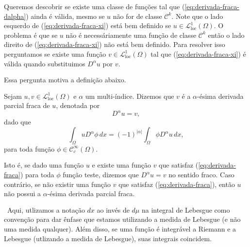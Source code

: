 \documentclass[a4paper, 11pt]{book}
\theoremstyle{definition}
\newcommand{\obs}{\noindent{\textbf{\textcolor{black}{\sffamily Observação:}}}~}
\newcommand{\cC}{\mathcal{C}}
\newcommand{\cL}{\mathcal{L}}
\begin{document}
Queremos descobrir se existe uma classe de funções tal que (\ref{eq:derivada-fraca-dalpha}) ainda é válida, mesmo se $u$ não for de classe $\cC ^k$. Note que o lado esquerdo de (\ref{eq:derivada-fraca-xi}) está bem definido se $u \in \cL^1_{\mathrm{loc}}(\Omega)$.
O problema é que se $u$ não é necessáriamente uma função de classe $\cC^k$ então o lado direito de (\ref{eq:derivada-fraca-xi}) não está bem definido. Para resolver isso perguntamos se existe uma função $v \in \cL^1_{\mathrm{loc}}(\Omega)$ tal que (\ref{eq:derivada-fraca-xi}) é válida quando substituimos $D^\alpha u$ por $v$.

Essa pergunta motiva a definição abaixo.

\begin{dbox}
    Sejam $u,v \in \cL^1_{\mathrm{loc}}(\Omega)$ e $\alpha$ um multi-índice. Dizemos que $v$ é a $\alpha$-ésima derivada parcial fraca de $u$, denotada por
    \[
        D^\alpha u = v,
    \]
    dado que
    \begin{equation} \label{eq:derivada-fraca}
        \int_\Omega u D^\alpha \phi \,dx = (-1)^{|\alpha|} \int_\Omega \phi D^\alpha u\,dx,
    \end{equation}
    para toda função $\phi \in \cC ^\infty_c(\Omega)$.
\end{dbox}

Isto é, se dado uma função $u$ e existe uma função $v$ que satisfaz (\ref{eq:derivada-fraca}) para toda $\phi$ função teste, dizemos que $D^\alpha u = v$ no sentido fraco.
Caso contrário, se não existir uma função $v$ que satisfaz (\ref{eq:derivada-fraca}), então $u$ não possui a $\alpha$-ésima derivada parcial fraca.

\obs Aqui, utlizamos a notação $dx$ ao invés de $d\mu$ na integral de Lebesgue como convenção para dar ênfase que estamos utilizando a medida de Lebesgue (e não uma medida qualquer).
Além disso, se uma função é integrável a Riemann e a Lebesgue (utlizando a medida de Lebesgue), suas integrais coincidem.
\end{document}
